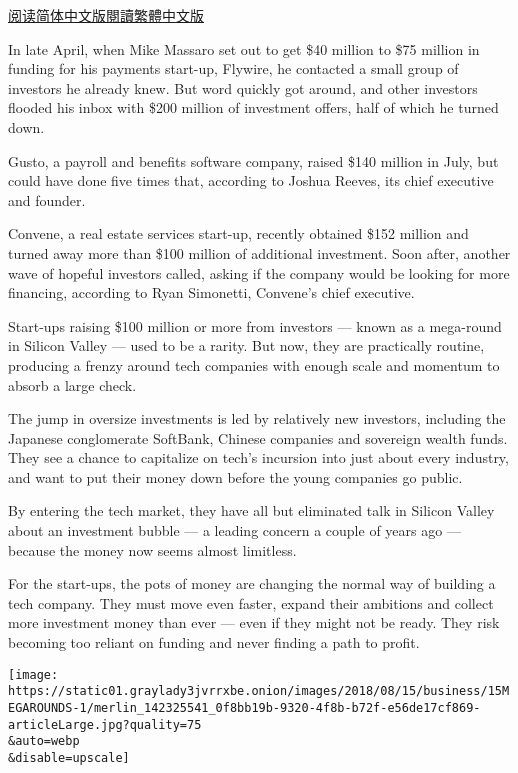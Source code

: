 \href{https://cn.nytimes3xbfgragh.onion/technology/20180820/venture-capital-mega-round/}{阅读简体中文版}\href{https://cn.nytimes3xbfgragh.onion/technology/20180820/venture-capital-mega-round/zh-hant/}{閱讀繁體中文版}

In late April, when Mike Massaro set out to get \$40 million to \$75
million in funding for his payments start-up, Flywire, he contacted a
small group of investors he already knew. But word quickly got around,
and other investors flooded his inbox with \$200 million of investment
offers, half of which he turned down.

Gusto, a payroll and benefits software company, raised \$140 million in
July, but could have done five times that, according to Joshua Reeves,
its chief executive and founder.

Convene, a real estate services start-up, recently obtained \$152
million and turned away more than \$100 million of additional
investment. Soon after, another wave of hopeful investors called, asking
if the company would be looking for more financing, according to Ryan
Simonetti, Convene's chief executive.

Start-ups raising \$100 million or more from investors --- known as a
mega-round in Silicon Valley --- used to be a rarity. But now, they are
practically routine, producing a frenzy around tech companies with
enough scale and momentum to absorb a large check.

The jump in oversize investments is led by relatively new investors,
including the Japanese conglomerate SoftBank, Chinese companies and
sovereign wealth funds. They see a chance to capitalize on tech's
incursion into just about every industry, and want to put their money
down before the young companies go public.

By entering the tech market, they have all but eliminated talk in
Silicon Valley about an investment bubble --- a leading concern a couple
of years ago --- because the money now seems almost limitless.

For the start-ups, the pots of money are changing the normal way of
building a tech company. They must move even faster, expand their
ambitions and collect more investment money than ever --- even if they
might not be ready. They risk becoming too reliant on funding and never
finding a path to profit.

\texttt{[image: https://static01.graylady3jvrrxbe.onion/images/2018/08/15/business/15MEGAROUNDS-1/merlin\_142325541\_0f8bb19b-9320-4f8b-b72f-e56de17cf869-articleLarge.jpg?quality=75\\\&auto=webp\\\&disable=upscale]}

